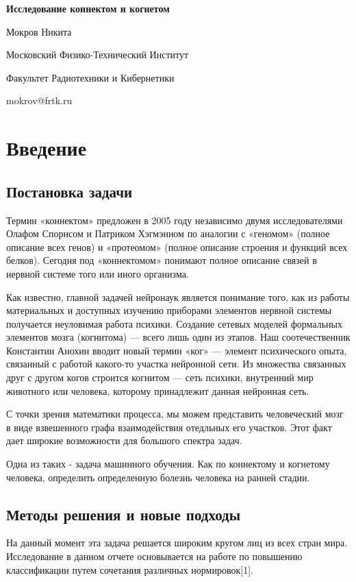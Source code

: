 \documentclass{urticle}
\begin{document}
\begin{center}
{\LARGE \textbf{Исследование коннектом и когнетом}}

{\Large Мокров Никита}

{\large Московский Физико-Технический Институт}

{\large Факультет Радиотехники и Кибернетики}

{\large mokrov@frtk.ru}
\end{center}

\section*{Введение}
\subsection*{Постановка задачи}
Термин «коннектом» предложен в 2005 году независимо двумя исследователями Олафом Спорнсом и Патриком Хэгмэнном по аналогии с «геномом» (полное описание всех генов) и «протеомом» (полное описание строения и функций всех белков). Сегодня под «коннектомом» понимают полное описание связей в нервной системе того или иного организма.

Как известно, главной задачей нейронаук является понимание того, как из работы материальных и доступных изучению приборами элементов нервной системы получается неуловимая работа психики. Создание сетевых моделей формальных элементов мозга (когнитома) — всего лишь один из этапов. Наш соотечественник Константин Анохин вводит новый термин «ког» — элемент психического опыта, связанный с работой какого-то участка нейронной сети. Из множества связанных друг с другом когов строится когнитом — сеть психики, внутренний мир животного или человека, которому принадлежит данная нейронная сеть.

С точки зрения математики процесса, мы можем представить человеческий мозг в виде взвешенного графа взаимодействия отедльных его участков. Этот факт дает широкие возможности для большого спектра задач. 

Одна из таких - задача машинного обучения. Как по коннектому и когнетому человека, определить определенную болезнь человека на ранней стадии.

\subsection*{Методы решения и новые подходы}
На данный момент эта задача решается широким кругом лиц из всех стран мира. Исследование в данном отчете основывается на работе по повышению классификации путем сочетания различных нормировок[1].
\end{document}
